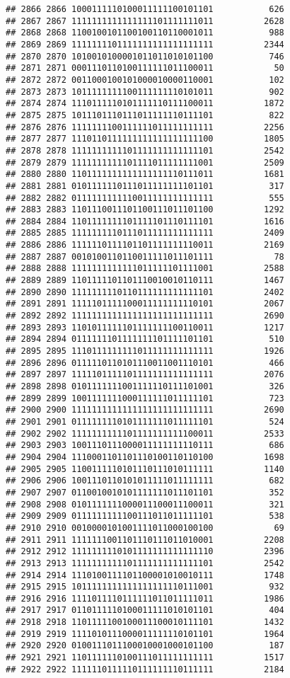 \documentclass[]{article}
\begin{document}
\begin{verbatim}
## 2866 2866 1000111110100011111100101101           626
## 2867 2867 1111111111111111101111111011          2628
## 2868 2868 1100100101100100110110001011           988
## 2869 2869 1111111101111111111111111111          2344
## 2870 2870 1010010100001011011010101100           746
## 2871 2871 0001110110100111111011100011            50
## 2872 2872 0011000100101000010000110001           102
## 2873 2873 1011111111100111111110101011           902
## 2874 2874 1110111110101111110111100011          1872
## 2875 2875 1011101110111011111110111101           822
## 2876 2876 1111111100111111011111111111          2256
## 2877 2877 1110110111111111111111111100          1805
## 2878 2878 1111111111101111111111111101          2542
## 2879 2879 1111111111101111011111111001          2509
## 2880 2880 1101111111111111111110111011          1681
## 2881 2881 0101111110111011111111101101           317
## 2882 2882 0111111111110011111111111111           555
## 2883 2883 1101110011101100111011101100          1292
## 2884 2884 1101111111101111101110111101          1616
## 2885 2885 1111111110111011111111111111          2409
## 2886 2886 1111110111101101111111110011          2169
## 2887 2887 0010100110110011111011101111            78
## 2888 2888 1111111111111011111101111001          2588
## 2889 2889 1101111101101110010010110111          1467
## 2890 2890 1111111110110111111111111101          2402
## 2891 2891 1111101111100011111111110101          2067
## 2892 2892 1111111111111111111111111111          2690
## 2893 2893 1101011111101111111100110011          1217
## 2894 2894 0111111101111111101111101101           510
## 2895 2895 1110111111111011111111111111          1926
## 2896 2896 0111110110101110011001110101           466
## 2897 2897 1111101111101111111111111111          2076
## 2898 2898 0101111111001111110111101001           326
## 2899 2899 1001111111000111111011111101           723
## 2900 2900 1111111111111111111111111111          2690
## 2901 2901 0111111110101111111011111101           524
## 2902 2902 1111111111101111111111100011          2533
## 2903 2903 1001110111000011111111110111           686
## 2904 2904 1110001101101110100110110100          1698
## 2905 2905 1100111110101110111010111111          1140
## 2906 2906 1001110110101011111011111111           682
## 2907 2907 0110010010101111111011101101           352
## 2908 2908 0101111111000011100011100011           321
## 2909 2909 0111111111100111011011111101           538
## 2910 2910 0010000101001111011000100100            69
## 2911 2911 1111111001101110111011010001          2208
## 2912 2912 1111111110101111111111111110          2396
## 2913 2913 1111111111101111111111111101          2542
## 2914 2914 1110100111101100001010010111          1748
## 2915 2915 1011111111111111111110111001           932
## 2916 2916 1111011110111111011011111011          1986
## 2917 2917 0110111110100011111010101101           404
## 2918 2918 1101111100100011100010111101          1432
## 2919 2919 1111010111000011111110101101          1964
## 2920 2920 0100111011100010001000101100           187
## 2921 2921 1101111110100111011111111111          1517
## 2922 2922 1111110111110111111110111111          2184
\end{verbatim}
\end{document}
